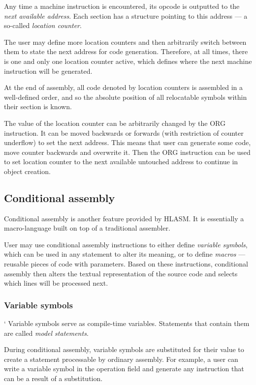 Any time a machine instruction is encountered, its opcode is outputted to the \emph{next available address}. Each section has a structure pointing to this address --- a so-called \emph{location counter}.

The user may define more location counters and then arbitrarily switch between them to state the next address for code generation. Therefore, at all times, there is one and only one location counter active, which defines where the next machine instruction will be generated.

At the end of assembly, all code denoted by location counters is assembled in a well-defined order, and so the absolute position of all relocatable symbols within their section is known.

The value of the location counter can be arbitrarily changed by the ORG instruction. It can be moved backwards or forwards (with restriction of counter underflow) to set the next address. This means that user can generate some code, move counter backwards and overwrite it. Then the ORG instruction can be used to set location counter to the next available untouched address to continue in object creation.

\subsection{Conditional assembly}
\label{CA_proc}

Conditional assembly is another feature provided by HLASM. It is essentially a macro-language built on top of a traditional assembler.

User may use conditional assembly instructions to either define \emph{variable symbols}, which can be used in any statement to alter its meaning, or to define \emph{macros} --- reusable pieces of code with parameters. Based on these instructions, conditional assembly then alters the textual representation of the source code and selects which lines will be processed next.

\subsubsection{Variable symbols}
\label{var_sym}`
Variable symbols serve as compile-time variables. Statements that contain them are called \emph{model statements}.

During conditional assembly, variable symbols are substituted for their value to create a statement processable by ordinary assembly. For example, a user can write a variable symbol in the operation field and generate any instruction that can be a result of a substitution.

